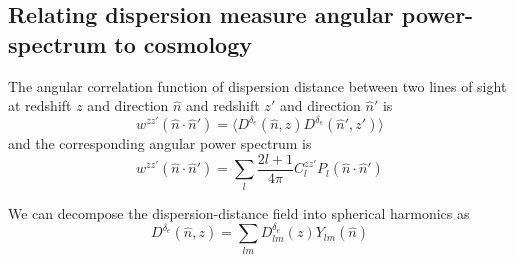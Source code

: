 \documentclass[twocolumn,prd,noshowpacs,nofootinbib,amsmath,amssymb]{revtex4}
\begin{document}
\subsection{Relating dispersion measure angular power-spectrum to cosmology}

The angular correlation function of dispersion distance between two lines of sight at redshift $z$ and direction $\hat{n}$ and redshift $z'$ and direction $\hat{n}'$ is
\begin{equation}
w^{z z'}(\hat{n}\cdot\hat{n}') = \langle D^{\delta_e}(\hat{n}, z) D^{\delta_e}(\hat{n}', z') \rangle
\end{equation}
and the corresponding angular power spectrum is
\begin{equation}
w^{z z'}(\hat{n}\cdot\hat{n}') = \sum_l \frac{2l+1}{4 \pi} C_l^{z z'} P_l(\hat{n}\cdot\hat{n}')
\end{equation}

We can decompose the dispersion-distance field into spherical harmonics as
\begin{equation}
    D^{\delta_e}(\hat{n}, z) = \sum_{l m} D^{\delta_e}_{l m}(z) Y_{l m} (\hat{n})
\end{equation}
\end{document}
